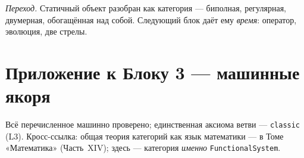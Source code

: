 \documentclass[12pt,a4paper]{article}
\begin{document}
\medskip
\noindent\emph{Переход.} Статичный объект разобран как категория --- биполная, регулярная, двумерная,
обогащённая над собой. Следующий блок даёт ему \emph{время}: оператор, эволюция, две стрелы.

\appendix
\section*{Приложение к Блоку 3 — машинные якоря}
\small\raggedright\sloppy
\noindent Всё перечисленное машинно проверено; единственная аксиома ветви --- \texttt{classic} (L3).
Кросс-ссылка: общая теория категорий как язык математики --- в Томе «Математика» (Часть~XIV); здесь ---
категория \emph{именно} \texttt{FunctionalSystem}.
\end{document}
